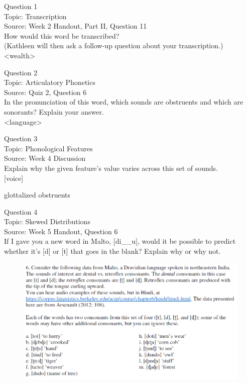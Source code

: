 \documentclass[12pt]{article}
\begin{document}
{\large Question 1}\\

Topic: Transcription\\
Source: Week 2 Handout, Part II, Question 11\\

How would this word be transcribed?\\ (Kathleen will then ask a follow-up question about your transcription.)\\

<wealth>


\newpage

{\large Question 2}\\

Topic: Articulatory Phonetics\\
Source: Quiz 2, Question 6\\

In the pronunciation of this word, which sounds are obstruents and which are sonorants? Explain your answer.\\

<language>


\newpage

{\large Question 3}\\

Topic: Phonological Features\\
Source: Week 4 Discussion\\

Explain why the given feature's value varies across this set of sounds.\\

{[voice]}

glottalized obstruents


\newpage

{\large Question 4}\\

Topic: Skewed Distributions\\
Source: Week 5 Handout, Question 6\\

If I gave you a new word in Malto, [di\_\_u], would it be possible to predict whether it's [d] or [t] that goes in the blank? Explain why or why not.\\

\begin{figure}[H]
\includegraphics{../images/malto.png}
\end{figure}
\end{document}
